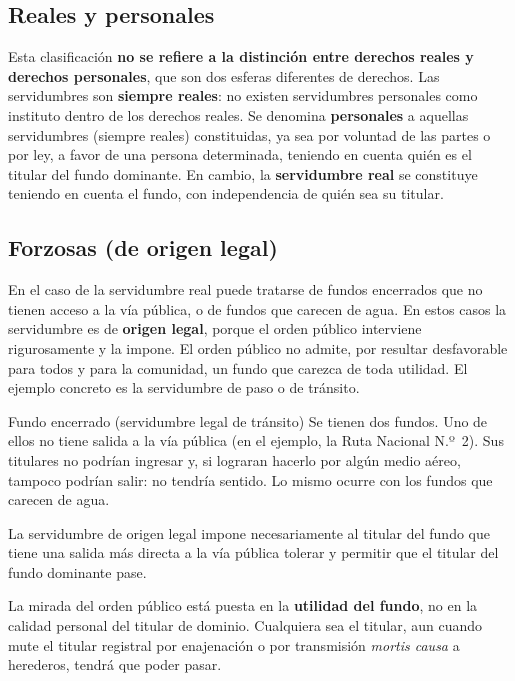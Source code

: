 \documentclass[12pt,oneside]{book}
\begin{document}
\subsection{Reales y personales}

Esta clasificación \textbf{no se refiere a la distinción entre derechos reales y derechos personales}, que son dos esferas diferentes de derechos. Las servidumbres son \textbf{siempre reales}: no existen servidumbres personales como instituto dentro de los derechos reales. Se denomina \textbf{personales} a aquellas servidumbres (siempre reales) constituidas, ya sea por voluntad de las partes o por ley, a favor de una persona determinada, teniendo en cuenta quién es el titular del fundo dominante. En cambio, la \textbf{servidumbre real} se constituye teniendo en cuenta el fundo, con independencia de quién sea su titular.


\subsection{Forzosas (de origen legal)}

En el caso de la servidumbre real puede tratarse de fundos encerrados que no tienen acceso a la vía pública, o de fundos que carecen de agua. En estos casos la servidumbre es de \textbf{origen legal}, porque el orden público interviene rigurosamente y la impone. El orden público no admite, por resultar desfavorable para todos y para la comunidad, un fundo que carezca de toda utilidad. El ejemplo concreto es la servidumbre de paso o de tránsito.

\begin{ejemplo}{Fundo encerrado (servidumbre legal de tránsito)}
Se tienen dos fundos. Uno de ellos no tiene salida a la vía pública (en el ejemplo, la Ruta Nacional N.º~2). Sus titulares no podrían ingresar y, si lograran hacerlo por algún medio aéreo, tampoco podrían salir: no tendría sentido. Lo mismo ocurre con los fundos que carecen de agua.

La servidumbre de origen legal impone necesariamente al titular del fundo que tiene una salida más directa a la vía pública tolerar y permitir que el titular del fundo dominante pase.
\end{ejemplo}

\begin{importante}
La mirada del orden público está puesta en la \textbf{utilidad del fundo}, no en la calidad personal del titular de dominio. Cualquiera sea el titular, aun cuando mute el titular registral por enajenación o por transmisión \textit{mortis causa} a herederos, tendrá que poder pasar.
\end{importante}
\end{document}

